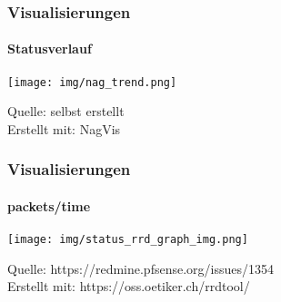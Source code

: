 \begin{frame}
\frametitle{Visualisierungen}
\framesubtitle{Statusverlauf}

    \texttt{[image: img/nag\_trend.png]}
    \vspace{0.5cm}
    
    \footnoterule
    \footnotesize{
        Quelle:          selbst erstellt\\
        Erstellt mit:    NagVis}

\end{frame}
\begin{frame}
\frametitle{Visualisierungen}
\framesubtitle{packets/time}

\texttt{[image: img/status\_rrd\_graph\_img.png]}
\vspace{0.5cm}

\footnoterule
\footnotesize{
   Quelle:          https://redmine.pfsense.org/issues/1354\\
   Erstellt mit:    https://oss.oetiker.ch/rrdtool/}


\end{frame}